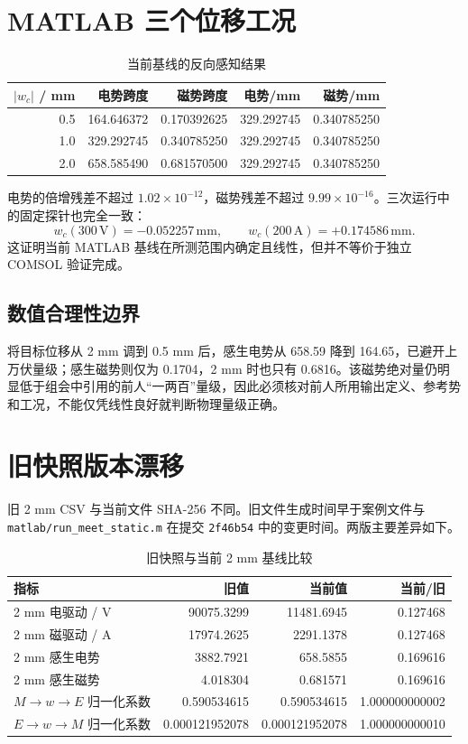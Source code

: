 \documentclass[UTF8,fontset=windows,11pt,a4paper]{ctexart}
\begin{document}
\section{MATLAB 三个位移工况}
\begin{table}[H]
\centering
\caption{当前基线的反向感知结果}
\small
\begin{tabular}{rrrrr}
\toprule
$|w_c|$ / mm & 电势跨度 & 磁势跨度 & 电势/mm & 磁势/mm \\
\midrule
0.5 & 164.646372 & 0.170392625 & 329.292745 & 0.340785250 \\
1.0 & 329.292745 & 0.340785250 & 329.292745 & 0.340785250 \\
2.0 & 658.585490 & 0.681570500 & 329.292745 & 0.340785250 \\
\bottomrule
\end{tabular}
\end{table}

电势的倍增残差不超过 $1.02\times10^{-12}$，磁势残差不超过 $9.99\times10^{-16}$。三次运行中的固定探针也完全一致：
\[
w_c(300\,\mathrm{V})=-0.052257\,\mathrm{mm},\qquad
w_c(200\,\mathrm{A})=+0.174586\,\mathrm{mm}.
\]
这证明当前 MATLAB 基线在所测范围内确定且线性，但并不等价于独立 COMSOL 验证完成。

\subsection{数值合理性边界}
将目标位移从 2 mm 调到 0.5 mm 后，感生电势从 658.59 降到 164.65，已避开上万伏量级；感生磁势则仅为 0.1704，2 mm 时也只有 0.6816。该磁势绝对量仍明显低于组会中引用的前人“一两百”量级，因此必须核对前人所用输出定义、参考势和工况，不能仅凭线性良好就判断物理量级正确。

\section{旧快照版本漂移}
旧 2 mm CSV 与当前文件 SHA-256 不同。旧文件生成时间早于案例文件与 \nolinkurl{matlab/run_meet_static.m} 在提交 \texttt{2f46b54} 中的变更时间。两版主要差异如下。

\begin{table}[H]
\centering
\caption{旧快照与当前 2 mm 基线比较}
\small
\begin{tabular}{lrrr}
\toprule
指标 & 旧值 & 当前值 & 当前/旧 \\
\midrule
2 mm 电驱动 / V & 90075.3299 & 11481.6945 & 0.127468 \\
2 mm 磁驱动 / A & 17974.2625 & 2291.1378 & 0.127468 \\
2 mm 感生电势 & 3882.7921 & 658.5855 & 0.169616 \\
2 mm 感生磁势 & 4.018304 & 0.681571 & 0.169616 \\
$M\!\to\!w\!\to\!E$ 归一化系数 & 0.590534615 & 0.590534615 & 1.000000000002 \\
$E\!\to\!w\!\to\!M$ 归一化系数 & 0.000121952078 & 0.000121952078 & 1.000000000010 \\
\bottomrule
\end{tabular}
\end{table}
\end{document}
